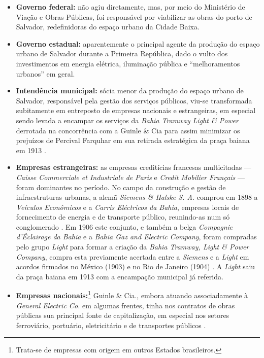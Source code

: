 \begin{itemize}
\item {}\textbf{Governo federal:} não agiu diretamente, mas, por meio do Ministério de Viação e Obras Públicas, foi responsável por viabilizar as obras do porto de Salvador, redefinidoras do espaço urbano da Cidade Baixa.
\item {}\textbf{Governo estadual:} aparentemente o principal agente da produção do espaço urbano de Salvador durante a Primeira República, dado o vulto dos investimentos em energia elétrica, iluminação pública e ``melhoramentos urbanos'' em geral.
\item {}\textbf{Intendência municipal:} sócia menor da produção do espaço urbano de Salvador, responsável pela gestão dos serviços públicos, viu-se transformada subitamente em entreposto de empresas nacionais e estrangeiras, em especial sendo levada a encampar os serviços da \textit{Bahia Tramway Light \& Power} derrotada na concorrência com a Guinle \& Cia para assim minimizar os prejuízos de Percival Farquhar em sua retirada estratégica da praça baiana em 1913 \cite[p.~76-89]{CUNHA2011}. 
\item {}\textbf{Empresas estrangeiras:} as empresas creditícias francesas multicitadas --- \textit{Caisse Commerciale et Industriale de Paris} e \textit{Credit Mobilier Français} --- foram dominantes no período. No campo da construção e gestão de infraestruturas urbanas, a alemã \textit{Siemens \& Halske S. A.} comprou em 1898 a \textit{Veículos Econômicos} e a \textit{Carris Eléctricos da Bahia}, empresas locais de fornecimento de energia e de transporte público, reunindo-as num só conglomerado \cite[p.~36]{CUNHA2011}. Em 1906 este conjunto, e também a belga \textit{Compagnie d'Éclairage da Bahia} e a \textit{Bahia Gaz and Electric Company}, foram compradas pelo grupo \textit{Light} para formar a criação da \textit{Bahia Tramway, Light \& Power Company}, compra esta previamente acertada entre a \textit{Siemens} e a \textit{Light} em acordos firmados no México (1903) e no Rio de Janeiro (1904) \cite[p.~34]{CUNHA2011}. A \textit{Light} saiu da praça baiana em 1913 com a encampação municipal já referida.
\item {}\textbf{Empresas nacionais:}\footnote{Trata-se de empresas com origem em outros Estados brasileiros.} Guinle \& Cia., embora atuando associadamente à \textit{General Electric Co.} em algumas frentes, tinha nos contratos de obras públicas sua principal fonte de capitalização, em especial nos setores ferroviário, portuário, eletricitário e de transportes públicos \cite[p.~43-44]{CUNHA2011}.

\end{itemize}
